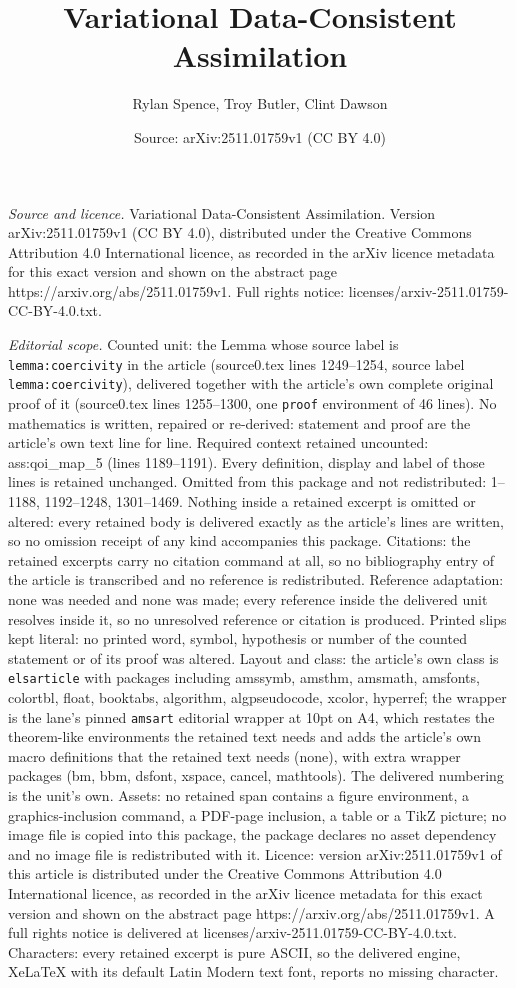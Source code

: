 \documentclass[10pt,a4paper]{amsart}
\title[Variational Data-Consistent Assimilation]{Variational Data-Consistent Assimilation}
\author{Rylan Spence, Troy Butler, Clint Dawson}
\date{Source: arXiv:2511.01759v1 (CC BY 4.0)}
\begin{document}
\maketitle

\noindent\emph{Source and licence.} Variational Data-Consistent Assimilation. Version arXiv:2511.01759v1 (CC BY 4.0), distributed under the Creative Commons Attribution 4.0 International licence, as recorded in the arXiv licence metadata for this exact version and shown on the abstract page https://arxiv.org/abs/2511.01759v1. Full rights notice: licenses/arxiv-2511.01759-CC-BY-4.0.txt.\par\smallskip

\noindent\textit{Editorial scope.} Counted unit: the Lemma whose source label is \texttt{lemma:coercivity} in the article (source0.tex lines 1249--1254, source label \texttt{lemma:coercivity}), delivered together with the article's own complete original proof of it (source0.tex lines 1255--1300, one \texttt{proof} environment of 46 lines). No mathematics is written, repaired or re-derived: statement and proof are the article's own text line for line. Required context retained uncounted: ass:qoi\_map\_5 (lines 1189--1191). Every definition, display and label of those lines is retained unchanged. Omitted from this package and not redistributed: 1--1188, 1192--1248, 1301--1469. Nothing inside a retained excerpt is omitted or altered: every retained body is delivered exactly as the article's lines are written, so no omission receipt of any kind accompanies this package. Citations: the retained excerpts carry no citation command at all, so no bibliography entry of the article is transcribed and no reference is redistributed. Reference adaptation: none was needed and none was made; every reference inside the delivered unit resolves inside it, so no unresolved reference or citation is produced. Printed slips kept literal: no printed word, symbol, hypothesis or number of the counted statement or of its proof was altered. Layout and class: the article's own class is \texttt{elsarticle} with packages including amssymb, amsthm, amsmath, amsfonts, colortbl, float, booktabs, algorithm, algpseudocode, xcolor, hyperref; the wrapper is the lane's pinned \texttt{amsart} editorial wrapper at 10pt on A4, which restates the theorem-like environments the retained text needs and adds the article's own macro definitions that the retained text needs (none), with extra wrapper packages (bm, bbm, dsfont, xspace, cancel, mathtools). The delivered numbering is the unit's own. Assets: no retained span contains a figure environment, a graphics-inclusion command, a PDF-page inclusion, a table or a TikZ picture; no image file is copied into this package, the package declares no asset dependency and no image file is redistributed with it. Licence: version arXiv:2511.01759v1 of this article is distributed under the Creative Commons Attribution 4.0 International licence, as recorded in the arXiv licence metadata for this exact version and shown on the abstract page https://arxiv.org/abs/2511.01759v1. A full rights notice is delivered at licenses/arxiv-2511.01759-CC-BY-4.0.txt. Characters: every retained excerpt is pure ASCII, so the delivered engine, XeLaTeX with its default Latin Modern text font, reports no missing character.
\end{document}
